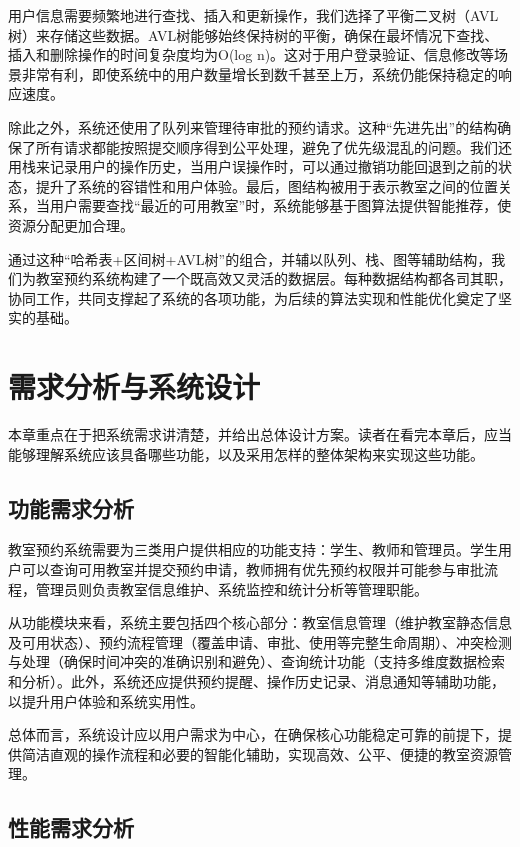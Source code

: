 \documentclass[a4paper,12pt,twoside]{ctexrep}
\begin{document}
用户信息需要频繁地进行查找、插入和更新操作，我们选择了平衡二叉树（AVL树）来存储这些数据。AVL树能够始终保持树的平衡，确保在最坏情况下查找、插入和删除操作的时间复杂度均为O(log n)。这对于用户登录验证、信息修改等场景非常有利，即使系统中的用户数量增长到数千甚至上万，系统仍能保持稳定的响应速度。

除此之外，系统还使用了队列来管理待审批的预约请求。这种“先进先出”的结构确保了所有请求都能按照提交顺序得到公平处理，避免了优先级混乱的问题。我们还用栈来记录用户的操作历史，当用户误操作时，可以通过撤销功能回退到之前的状态，提升了系统的容错性和用户体验。最后，图结构被用于表示教室之间的位置关系，当用户需要查找“最近的可用教室”时，系统能够基于图算法提供智能推荐，使资源分配更加合理。

通过这种“哈希表+区间树+AVL树”的组合，并辅以队列、栈、图等辅助结构，我们为教室预约系统构建了一个既高效又灵活的数据层。每种数据结构都各司其职，协同工作，共同支撑起了系统的各项功能，为后续的算法实现和性能优化奠定了坚实的基础。


\chapter{需求分析与系统设计}

本章重点在于把系统需求讲清楚，并给出总体设计方案。读者在看完本章后，应当能够理解系统应该具备哪些功能，以及采用怎样的整体架构来实现这些功能。

\section{功能需求分析}

教室预约系统需要为三类用户提供相应的功能支持：学生、教师和管理员。学生用户可以查询可用教室并提交预约申请，教师拥有优先预约权限并可能参与审批流程，管理员则负责教室信息维护、系统监控和统计分析等管理职能。

从功能模块来看，系统主要包括四个核心部分：教室信息管理（维护教室静态信息及可用状态）、预约流程管理（覆盖申请、审批、使用等完整生命周期）、冲突检测与处理（确保时间冲突的准确识别和避免）、查询统计功能（支持多维度数据检索和分析）。此外，系统还应提供预约提醒、操作历史记录、消息通知等辅助功能，以提升用户体验和系统实用性。

总体而言，系统设计应以用户需求为中心，在确保核心功能稳定可靠的前提下，提供简洁直观的操作流程和必要的智能化辅助，实现高效、公平、便捷的教室资源管理。

\section{性能需求分析}
\end{document}
